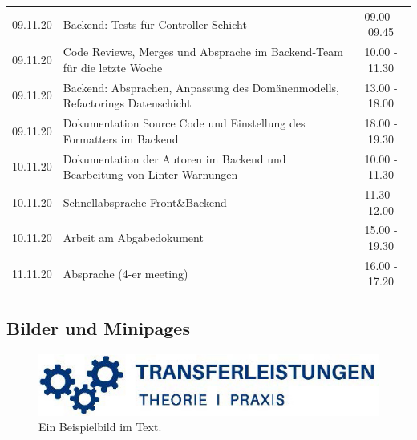 \begin{longtable}{cp{}c}
    09.11.20 & Backend: Tests für Controller-Schicht                                           & 09.00 - 09.45           \\
    09.11.20 & Code Reviews, Merges und Absprache im Backend-Team für die letzte Woche         & 10.00 - 11.30           \\
    09.11.20 & Backend: Absprachen, Anpassung des Domänenmodells, Refactorings Datenschicht    & 13.00 - 18.00           \\
    09.11.20 & Dokumentation Source Code und Einstellung des Formatters im Backend             & 18.00 - 19.30           \\
    10.11.20 & Dokumentation der Autoren im Backend und Bearbeitung von Linter-Warnungen       & 10.00 - 11.30           \\
    10.11.20 & Schnellabsprache Front\&Backend                                                 & 11.30 - 12.00           \\
    10.11.20 & Arbeit am Abgabedokument                                                        & 15.00 - 19.30           \\
    11.11.20 & Absprache (4-er meeting)                                                        & 16.00 - 17.20 
    \\*
    \end{longtable}

\subsection{Bilder und Minipages}

\begin{figure}[H]
    \centering
    \includegraphics[width=\textwidth]{image/transferleistung.jpg}
    \caption{Ein Beispielbild im Text.}
    \label{fig:tl-logo}
\end{figure}

